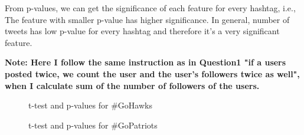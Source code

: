\documentclass{article}
\begin{document}
From p-values, we can get the significance of each feature for every hashtag, i.e., The feature with smaller p-value has higher significance. In general, number of tweets has low p-value for every hashtag and therefore it's a very significant feature.

\textbf{Note: Here I follow the same instruction as in Question1 "if a users posted twice, we count the user and the user’s followers twice as well", when I calculate sum of the number of followers of the users.}

\begin{figure}
\centering
{}
\caption{t-test and p-values for \#GoHawks} \label{Q3_1}
\end{figure}

\begin{figure}
\centering
{}
\caption{t-test and p-values for \#GoPatriots} \label{Q3_2}
\end{figure}
\end{document}
